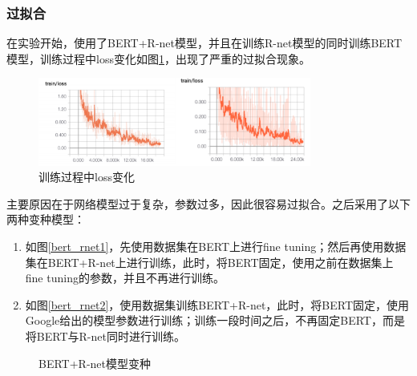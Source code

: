 \documentclass[10pt, a4]{extarticle}
\begin{document}
\subsubsection{过拟合}
在实验开始，使用了BERT+R-net模型，并且在训练R-net模型的同时训练BERT模型，训练过程中loss变化如图\ref{loss}，出现了严重的过拟合现象。
\begin{figure}[H]
	\centering
	\includegraphics[width=0.8\textwidth]{figure/loss.png}
	\caption{训练过程中loss变化}
	\label{loss}
\end{figure}
主要原因在于网络模型过于复杂，参数过多，因此很容易过拟合。之后采用了以下两种变种模型：
\begin{enumerate}
	\item 如图\ref{bert_rnet1}，先使用数据集在BERT上进行fine tuning；然后再使用数据集在BERT+R-net上进行训练，此时，将BERT固定，使用之前在数据集上fine tuning的参数，并且不再进行训练。
	\item 如图\ref{bert_rnet2}，使用数据集训练BERT+R-net，此时，将BERT固定，使用Google给出的模型参数进行训练；训练一段时间之后，不再固定BERT，而是将BERT与R-net同时进行训练。
\end{enumerate}
\begin{figure}[H]
	\centering  %
	\caption{BERT+R-net模型变种}
	\label{bert_rnet}
\end{figure}
\end{document}
